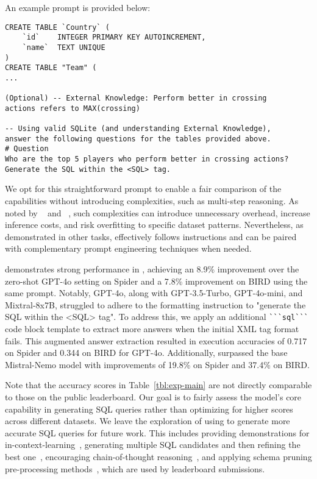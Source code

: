\noindent An example prompt is provided below:
\begin{tcolorbox}[left=1pt, right=0pt, top=1pt, bottom=1pt]
\begin{Verbatim}
CREATE TABLE `Country` (
	`id`    INTEGER PRIMARY KEY AUTOINCREMENT,
	`name`  TEXT UNIQUE
) 
CREATE TABLE "Team" (
...

(Optional) -- External Knowledge: Perform better in crossing 
actions refers to MAX(crossing)

-- Using valid SQLite (and understanding External Knowledge), 
answer the following questions for the tables provided above.
# Question
Who are the top 5 players who perform better in crossing actions?
Generate the SQL within the <SQL> tag.
\end{Verbatim}
\end{tcolorbox}

We opt for this straightforward prompt to enable a fair comparison of the \texttosql capabilities without introducing complexities, such as multi-step reasoning. As noted by ~\citet{wretblad2024understandingeffectsnoisetexttosql} and ~\citet{kapoor2024aiagentsmatter}, such complexities can introduce unnecessary overhead, increase inference costs, and risk overfitting to specific dataset patterns. Nevertheless, as demonstrated in other tasks, \modelname effectively follows instructions and can be paired with complementary prompt engineering techniques when needed. 

\modelname demonstrates strong performance in \texttosql, achieving an 8.9\% improvement over the zero-shot GPT-4o setting on Spider and a 7.8\% improvement on BIRD using the same prompt. Notably, GPT-4o, along with GPT-3.5-Turbo, GPT-4o-mini, and Mixtral-8x7B, struggled to adhere to the formatting instruction to "generate the SQL within the <SQL> tag". To address this, we apply an additional \verb|```sql```| code block template to extract more answers when the initial XML tag format fails. This augmented answer extraction resulted in execution accuracies of 0.717 on Spider and 0.344 on BIRD for GPT-4o.
Additionally, \modelname surpassed the base Mistral-Nemo model with improvements of 19.8\% on Spider and 37.4\% on BIRD.

Note that the accuracy scores in Table~\ref{tbl:exp-main} are not directly comparable to those on the public leaderboard. Our goal is to fairly assess the model's core capability in generating SQL queries rather than optimizing for higher scores across different datasets. We leave the exploration of using \modelname to generate more accurate SQL queries for future work. This includes providing demonstrations for in-context-learning~\citep{gao2024xiyan,pourreza2024chase}, generating multiple SQL candidates and then refining the best one~\citep{gao2024xiyan}, encouraging chain-of-thought reasoning~\citep{pourreza2024chase}, and applying schema pruning pre-processing methods~\citep{talaei2024chess}, which are used by leaderboard submissions.

